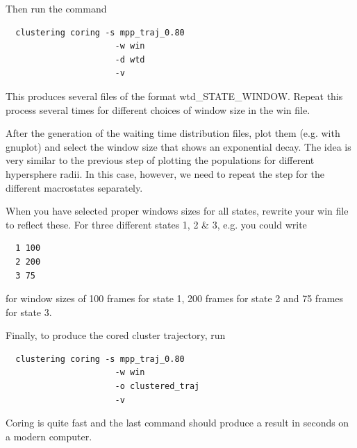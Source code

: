 \documentclass[12pt,a4paper,twoside,english,fleqn]{article}
\begin{document}
Then run the command
\begin{lstlisting}
  clustering coring -s mpp_traj_0.80
                      -w win
                      -d wtd
                      -v
\end{lstlisting}

This produces several files of the format {\ttfamily wtd\_STATE\_WINDOW}.
Repeat this process several times for different choices of window size in the
{\ttfamily win} file.

After the generation of the waiting time distribution files, plot them (e.g.
with gnuplot) and select the window size that shows an exponential decay.
The idea is very similar to the previous step of plotting the populations
for different hypersphere radii. In this case, however, we need to repeat the
step for the different macrostates separately.

When you have selected proper windows sizes for all states, rewrite your
{\ttfamily win} file to reflect these. For three different states 1, 2
\& 3, e.g. you could write
\begin{lstlisting}
  1 100
  2 200
  3 75
\end{lstlisting}
for window sizes of 100 frames for state 1, 200 frames for state 2 and 75
frames for state 3.

Finally, to produce the cored cluster trajectory, run
\begin{lstlisting}
  clustering coring -s mpp_traj_0.80
                      -w win
                      -o clustered_traj
                      -v
\end{lstlisting}

\begin{mdframed}[innertopmargin=20pt]
  Coring is quite fast and the last command should produce a result in seconds
  on a modern computer.
\end{mdframed}




\end{document}
